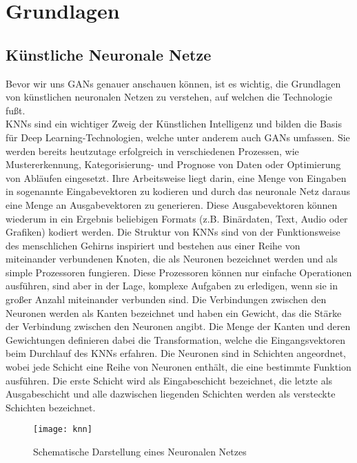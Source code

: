\chapter{Grundlagen}

\section{Künstliche Neuronale Netze}

\noindent Bevor wir uns GANs genauer anschauen können, ist es wichtig, die Grundlagen von künstlichen neuronalen Netzen zu verstehen, auf welchen die Technologie fußt.\\

\noindent \acp{KNN} sind ein wichtiger Zweig der Künstlichen Intelligenz und bilden die Basis für Deep Learning-Technologien, welche unter anderem auch GANs umfassen. Sie werden bereits heutzutage erfolgreich in verschiedenen Prozessen, wie Mustererkennung, Kategorisierung- und Prognose von Daten oder Optimierung von Abläufen eingesetzt. Ihre Arbeitsweise liegt darin, eine Menge von Eingaben in sogenannte Eingabevektoren zu kodieren und durch das neuronale Netz daraus eine Menge an Ausgabevektoren zu generieren. Diese Ausgabevektoren können wiederum in ein Ergebnis beliebigen Formats (z.B. Binärdaten, Text, Audio oder Grafiken) kodiert werden. Die Struktur von \acp{KNN} sind von der Funktionsweise des menschlichen Gehirns inspiriert und bestehen aus einer Reihe von miteinander verbundenen Knoten, die als Neuronen bezeichnet werden und als simple Prozessoren fungieren. Diese Prozessoren können nur einfache Operationen ausführen, sind aber in der Lage, komplexe Aufgaben zu erledigen, wenn sie in großer Anzahl miteinander verbunden sind. Die Verbindungen zwischen den Neuronen werden als Kanten bezeichnet und haben ein Gewicht, das die Stärke der Verbindung zwischen den Neuronen angibt. Die Menge der Kanten und deren Gewichtungen definieren dabei die Transformation, welche die Eingangsvektoren beim Durchlauf des \ac{KNN}s erfahren. Die Neuronen sind in Schichten angeordnet, wobei jede Schicht eine Reihe von Neuronen enthält, die eine bestimmte Funktion ausführen. Die erste Schicht wird als Eingabeschicht bezeichnet, die letzte als Ausgabeschicht und alle dazwischen liegenden Schichten werden als versteckte Schichten bezeichnet.\\

\newpage


\begin{figure}[h]
    \centering
    \texttt{[image: knn]}
    \caption{Schematische Darstellung eines Neuronalen Netzes}
    \label{Abb:basic}
    \end{figure}


\newpage